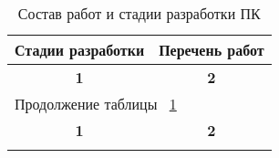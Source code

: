 \begin{center}
\begin{longtable}{|l|l|}
\caption{Состав работ и стадии разработки ПК} \label{tab:eco1} \\ \hline
\multicolumn{1}{|c|}{\textbf{Стадии разработки}}    &   \multicolumn{1}{c|}{\textbf{Перечень работ}} \\ \hline
\multicolumn{1}{|c|}{\textbf{1}}    &   \multicolumn{1}{c|}{\textbf{2}} \\ \hline
\endfirsthead

\multicolumn{2}{|l|}{{Продолжение таблицы ~\ref{tab:eco1}}} \\ %
\hline \multicolumn{1}{|c|}{\textbf{1}} &
\multicolumn{1}{c|}{\textbf{2}} \\ \hline 
\endhead

\endfoot


\end{longtable}
\end{center}
